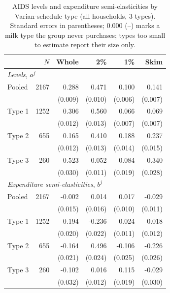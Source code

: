 \begin{table}[htbp]
\centering
\caption{AIDS levels and expenditure semi-elasticities by Varian-schedule
type (all households, 3 types). Standard errors in parentheses;
0.000 (--) marks a milk type the group never purchases; types too small
to estimate report their size only.}
\label{tab:aids_types_varian_all}
\begin{tabular}{lrrrrr}
\toprule
 & $N$ & Whole & 2\% & 1\% & Skim \\
\midrule
\multicolumn{6}{l}{\textit{Levels}, $a^j$} \\
Pooled & 2167 & 0.288 & 0.471 & 0.100 & 0.141 \\
 & & (0.009) & (0.010) & (0.006) & (0.007) \\
\addlinespace
Type 1 & 1252 & 0.306 & 0.560 & 0.066 & 0.069 \\
 & & (0.012) & (0.013) & (0.007) & (0.007) \\
Type 2 & 655 & 0.165 & 0.410 & 0.188 & 0.237 \\
 & & (0.012) & (0.013) & (0.014) & (0.015) \\
Type 3 & 260 & 0.523 & 0.052 & 0.084 & 0.340 \\
 & & (0.030) & (0.011) & (0.019) & (0.028) \\
\midrule
\multicolumn{6}{l}{\textit{Expenditure semi-elasticities}, $b^j$} \\
Pooled & 2167 & -0.002 & 0.014 & 0.017 & -0.029 \\
 & & (0.015) & (0.016) & (0.010) & (0.011) \\
\addlinespace
Type 1 & 1252 & 0.194 & -0.236 & 0.024 & 0.018 \\
 & & (0.020) & (0.022) & (0.011) & (0.012) \\
Type 2 & 655 & -0.164 & 0.496 & -0.106 & -0.226 \\
 & & (0.021) & (0.024) & (0.025) & (0.026) \\
Type 3 & 260 & -0.102 & 0.016 & 0.115 & -0.029 \\
 & & (0.032) & (0.012) & (0.019) & (0.030) \\
\bottomrule
\end{tabular}
\end{table}
